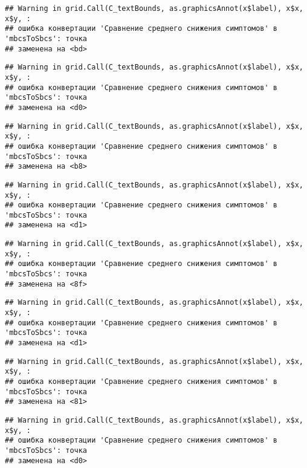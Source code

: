 \documentclass[
]{article}
\begin{document}
\begin{verbatim}
## Warning in grid.Call(C_textBounds, as.graphicsAnnot(x$label), x$x, x$y, :
## ошибка конвертации 'Сравнение среднего снижения симптомов' в 'mbcsToSbcs': точка
## заменена на <bd>
\end{verbatim}

\begin{verbatim}
## Warning in grid.Call(C_textBounds, as.graphicsAnnot(x$label), x$x, x$y, :
## ошибка конвертации 'Сравнение среднего снижения симптомов' в 'mbcsToSbcs': точка
## заменена на <d0>
\end{verbatim}

\begin{verbatim}
## Warning in grid.Call(C_textBounds, as.graphicsAnnot(x$label), x$x, x$y, :
## ошибка конвертации 'Сравнение среднего снижения симптомов' в 'mbcsToSbcs': точка
## заменена на <b8>
\end{verbatim}

\begin{verbatim}
## Warning in grid.Call(C_textBounds, as.graphicsAnnot(x$label), x$x, x$y, :
## ошибка конвертации 'Сравнение среднего снижения симптомов' в 'mbcsToSbcs': точка
## заменена на <d1>
\end{verbatim}

\begin{verbatim}
## Warning in grid.Call(C_textBounds, as.graphicsAnnot(x$label), x$x, x$y, :
## ошибка конвертации 'Сравнение среднего снижения симптомов' в 'mbcsToSbcs': точка
## заменена на <8f>
\end{verbatim}

\begin{verbatim}
## Warning in grid.Call(C_textBounds, as.graphicsAnnot(x$label), x$x, x$y, :
## ошибка конвертации 'Сравнение среднего снижения симптомов' в 'mbcsToSbcs': точка
## заменена на <d1>
\end{verbatim}

\begin{verbatim}
## Warning in grid.Call(C_textBounds, as.graphicsAnnot(x$label), x$x, x$y, :
## ошибка конвертации 'Сравнение среднего снижения симптомов' в 'mbcsToSbcs': точка
## заменена на <81>
\end{verbatim}

\begin{verbatim}
## Warning in grid.Call(C_textBounds, as.graphicsAnnot(x$label), x$x, x$y, :
## ошибка конвертации 'Сравнение среднего снижения симптомов' в 'mbcsToSbcs': точка
## заменена на <d0>
\end{verbatim}
\end{document}
